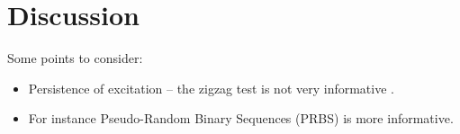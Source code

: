 \section{Discussion}
\label{sec:discussion}

Some points to consider:
\begin{itemize}
    \item Persistence of excitation -- the zigzag test is not very informative \citep{sutulo_algorithm_2014}.
    \item For instance Pseudo-Random Binary Sequences (PRBS) \citep{landau_digital_2006} is more informative.
\end{itemize}
